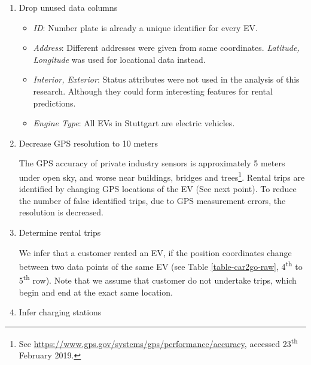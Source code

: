 \documentclass[a4paper, 12pt]{article}
\begin{document}
\begin{enumerate}
\item Drop unused data columns

\begin{itemize}
\item \emph{ID}: Number plate is already a unique identifier for every EV.
\item \emph{Address}: Different addresses were given from same coordinates. \emph{Latitude,
Longitude} was used for locational data instead.
\item \emph{Interior, Exterior}: Status attributes were not used in the analysis of
this research. Although they could form interesting features for rental
predictions.
\item \emph{Engine Type}: All EVs in Stuttgart are electric vehicles.
\end{itemize}
\item Decrease GPS resolution to 10 meters

The GPS accuracy of private industry sensors is approximately 5 meters under
open sky, and worse near buildings, bridges and trees\footnote{See \url{https://www.gps.gov/systems/gps/performance/accuracy}, accessed
23\textsuperscript{th} February 2019.}. Rental trips are
identified by changing GPS locations of the EV (See next point). To reduce
the number of false identified trips, due to GPS measurement errors, the resolution
is decreased.
\item Determine rental trips

We infer that a customer rented an EV, if the position coordinates change
between two data points of the same EV (see Table \ref{table-car2go-raw}, 4\textsuperscript{th}
to 5\textsuperscript{th} row). Note that we assume that customer do not undertake trips,
which begin and end at the exact same location.
\item Infer charging stations


\end{enumerate}
\end{document}
